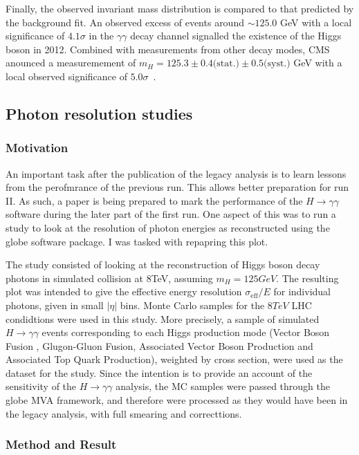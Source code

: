 \documentclass[10pt]{article}
\begin{document}
Finally, the observed invariant mass distribution is compared to that predicted by the background fit. An observed excess of events around $\sim125.0$ GeV with a local significance of $4.1 \sigma$ in the $\gamma \gamma$ decay channel signalled the existence of the Higgs boson in 2012. Combined with measurements from other decay modes, CMS anounced a measuremement of $m_H=125.3 \pm 0.4 \text{(stat.)} \pm 0.5 \text{(syst.)}$ GeV with a local observed significance of $5.0 \sigma$~\cite{HDisc}.


\subsection{Photon resolution studies}

\subsubsection{Motivation}

An important task after the publication of the legacy analysis is to learn lessons from the perofmrance of the previous run. This allows better preparation for run II. As such, a paper is being prepared to mark the performance of the $H \rightarrow \gamma\gamma$ software during the later part of the first run. One aspect of this was to run a study to look at the resolution of photon energies as reconstructed using the globe software package. I was tasked with repapring this plot.

The study consisted of looking at the reconstruction of Higgs boson decay photons in simulated collision at 8TeV, assuming $m_H = 125GeV$. The resulting plot was intended to give the effective energy resolution $\sigma_{\text{eff}}/E$ for individual photons, given in small $|\eta|$ bins.
Monte Carlo samples for the $8TeV$ LHC condidtions were used in this study. More precisely, a sample of simulated $H \rightarrow \gamma \gamma$ events corresponding to each Higgs production mode (Vector Boson Fusion , Glugon-Gluon Fusion, Associated Vector Boson Production and Associated Top Quark Production), weighted by cross section, were used as the dataset for the study.
Since the intention is to provide an account of the sensitivity of the $H \rightarrow \gamma\gamma$ analysis, the MC samples were passed through the globe MVA framework, and therefore were processed as they would have been in the legacy analysis, with full smearing and correcttions.



\subsubsection{Method and Result}
\end{document}

